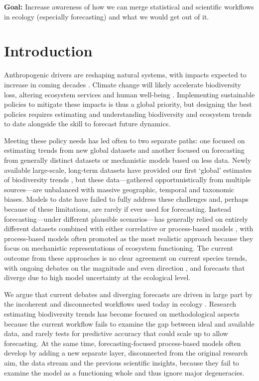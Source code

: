 \documentclass[11pt]{article}
\begin{document}
{\noindent \bf Goal:} Increase awareness of how we can merge statistical and scientific workflows in ecology (especially forecasting) and what we would get out of it.
\vspace*{0.5cm}

\section{Introduction}

Anthropogenic drivers are reshaping natural systems, with impacts expected to increase in coming decades \citep{Diaz2019}. Climate change will likely accelerate biodiversity loss, altering ecosystem services and human well-being \citep{IPBES2019}. Implementing sustainable policies to mitigate these impacts is thus a global priority, but designing the best policies requires estimating and understanding biodiversity and ecosystem trends to date alongside the skill to forecast future dynamics. %

Meeting these policy needs has led often to two separate paths: one focused on estimating trends from new global datasets and another focused on forecasting from generally distinct datasets or mechanistic models based on less data. Newly available large-scale, long-term datasets have provided our first `global' estimates of biodiversity trends \citep[e.g.][]{Dornelas2018}, but these data---gathered opportunistically from multiple sources---are unbalanced with massive geographic, temporal and taxonomic biases. Models to date have failed to fully address these challenges and, perhaps because of these limitations, are rarely if ever used for forecasting. 
Instead forecasting---under different plausible scenarios---has generally relied on entirely different datasets combined with either correlative or process-based models \citep{IPBES2019}, with process-based models often promoted as the most realistic approach \citep{Urban2016, Pilowsky2022} because they focus on mechanistic representations of ecosystem functioning. The current outcome from these approaches is no clear agreement on current species trends, with ongoing debates on the magnitude and even direction \citep{Dornelas2014, Leung2020, Buschke2021, Johnson2024}, and forecasts that diverge due to high model uncertainty at the ecological level. 

We argue that current debates and diverging forecasts are driven in large part by the incoherent and disconnected workflows used today in ecology \citep{Loreau2022, Talis2023, Johnson2024}. Research estimating biodiversity trends has become focused on methodological aspects because the current workflow fails to examine the gap between ideal and available data, and rarely tests for predictive accuracy that could scale up to allow forecasting. At the same time, forecasting-focused process-based models often develop by adding a new separate layer, disconnected from the original research aim, the data stream and the previous scientific insights, because they fail to examine the model as a functioning whole and thus ignore major degeneracies. 
\end{document}
